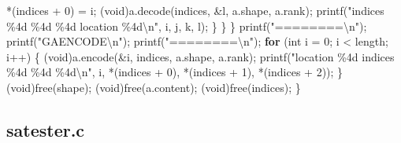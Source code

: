 \documentclass[
  12pt,
]{article}
\newenvironment{Shaded}{\begin{snugshade}}{\end{snugshade}}
\newcommand{\ControlFlowTok}[1]{\textcolor[rgb]{0.13,0.29,0.53}{\textbf{#1}}}
\newcommand{\DataTypeTok}[1]{\textcolor[rgb]{0.13,0.29,0.53}{#1}}
\newcommand{\DecValTok}[1]{\textcolor[rgb]{0.00,0.00,0.81}{#1}}
\newcommand{\NormalTok}[1]{#1}
\newcommand{\SpecialCharTok}[1]{\textcolor[rgb]{0.00,0.00,0.00}{#1}}
\newcommand{\StringTok}[1]{\textcolor[rgb]{0.31,0.60,0.02}{#1}}
\begin{document}
\begin{Shaded}
\begin{Highlighting}[]
\NormalTok{        *(indices + }\DecValTok{0}\NormalTok{) = i;}
\NormalTok{        (}\DataTypeTok{void}\NormalTok{)a.decode(indices, \&l, a.shape, a.rank);}
\NormalTok{        printf(}\StringTok{"indices \%4d \%4d \%4d location \%4d}\SpecialCharTok{\textbackslash{}n}\StringTok{"}\NormalTok{, i, j, k, l);}
\NormalTok{      \}}
\NormalTok{    \}}
\NormalTok{  \}}
\NormalTok{  printf(}\StringTok{"========}\SpecialCharTok{\textbackslash{}n}\StringTok{"}\NormalTok{);}
\NormalTok{  printf(}\StringTok{"GAENCODE}\SpecialCharTok{\textbackslash{}n}\StringTok{"}\NormalTok{);}
\NormalTok{  printf(}\StringTok{"========}\SpecialCharTok{\textbackslash{}n}\StringTok{"}\NormalTok{);}
  \ControlFlowTok{for}\NormalTok{ (}\DataTypeTok{int}\NormalTok{ i = }\DecValTok{0}\NormalTok{; i \textless{} length; i++) \{}
\NormalTok{    (}\DataTypeTok{void}\NormalTok{)a.encode(\&i, indices, a.shape, a.rank);}
\NormalTok{    printf(}\StringTok{"location \%4d indices \%4d \%4d \%4d}\SpecialCharTok{\textbackslash{}n}\StringTok{"}\NormalTok{, i, *(indices + }\DecValTok{0}\NormalTok{),}
\NormalTok{           *(indices + }\DecValTok{1}\NormalTok{), *(indices + }\DecValTok{2}\NormalTok{));}
\NormalTok{  \}}
\NormalTok{  (}\DataTypeTok{void}\NormalTok{)free(shape);}
\NormalTok{  (}\DataTypeTok{void}\NormalTok{)free(a.content);}
\NormalTok{  (}\DataTypeTok{void}\NormalTok{)free(indices);}
\NormalTok{\}}
\end{Highlighting}
\end{Shaded}

\hypertarget{satester.c}{%
\subsection{satester.c}\label{satester.c}}
\end{document}
